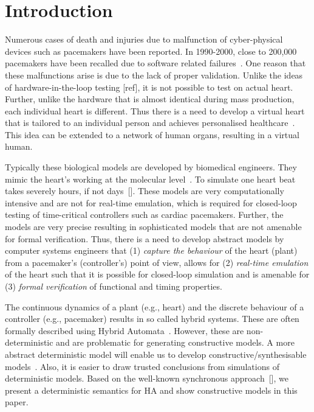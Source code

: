\section{Introduction}

Numerous cases of death and injuries due to malfunction of 
cyber-physical devices such as  pacemakers have been reported.
In 1990-2000, close to 200,000 pacemakers have been recalled
due to software related failures~\cite{alemzadeh13}.
 One reason that these malfunctions
arise is due to the lack of proper validation.
Unlike the ideas of hardware-in-the-loop testing [ref],
it is not possible to test on actual heart.
Further, unlike the hardware that is almost identical 
during mass production, each individual heart is different.
Thus there is a need to develop a virtual heart that is tailored
to an individual person and achieves
 personalised healthcare~\cite{Trayanova2014}. This idea can be extended 
to a network of human organs, resulting in a virtual human.

Typically these biological  models are  developed by biomedical engineers.
They mimic the heart's working at the
molecular level~\cite{Trayanova2014}. 
To simulate one heart beat takes severely hours, if not days~[].
These models are very computationally intensive and 
are not for real-time emulation,
which is required for closed-loop testing of time-critical 
controllers such as cardiac pacemakers.
Further, the models are 
 very precise resulting in sophisticated models that 
 are not amenable for  formal verification. 
Thus, there is a need to develop abstract models 
by computer systems engineers that  
(1)  \emph{capture the behaviour} of the heart (plant) 
from a pacemaker's (controller's) point of view,
allows for (2) \emph{real-time emulation} of the heart 
such that it is possible for closed-loop simulation and
is amenable for (3) \emph{formal verification} of 
functional and timing properties.


The continuous dynamics of a plant (e.g., heart) and
 the discrete behaviour of a controller (e.g., pacemaker) 
 results in so called hybrid systems. 
 These are often formally described using Hybrid Automata~\cite{alur2015principles,raskin05,chen201487}.
 However, these are non-deterministic and are problematic
 for generating constructive models.
 A more abstract deterministic model will enable us to
 develop constructive/synthesisable models~\cite{Lee2014}. Also, 
 it is easier to draw trusted conclusions from simulations
 of deterministic models. Based on the
 well-known synchronous approach~[], 
 we present a deterministic semantics for \ac{HA} and show
 constructive models in this paper.

